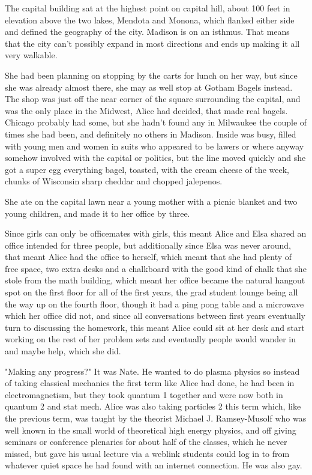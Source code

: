 The capital building sat at the highest point on capital hill, about 100 feet in elevation above the two lakes, Mendota and Monona, which flanked either side and defined the geography of the city. Madison is on an isthmus. That means that the city can't possibly expand in most directions and ends up making it all very walkable.

She had been planning on stopping by the carts for lunch on her way, but since she was already almost there, she may as well stop at Gotham Bagels instead. The shop was just off the near corner of the square surrounding the capital, and was the only place in the Midwest, Alice had decided, that made real bagels. Chicago probably had some, but she hadn't found any in Milwaukee the couple of times she had been, and definitely no others in Madison. Inside was busy, filled with young men and women in suits who appeared to be lawers or where anyway somehow involved with the capital or politics, but the line moved quickly and she got a super egg everything bagel, toasted, with the cream cheese of the week, chunks of Wisconsin sharp cheddar and chopped jalepenos. 

She ate on the capital lawn near a young mother with a picnic blanket and two young children, and made it to her office by three. 

\mypause

Since girls can only be officemates with girls, this meant Alice and Elsa shared an office intended for three people, but additionally since Elsa was never around, that meant Alice had the office to herself, which meant that she had plenty of free space, two extra desks and a chalkboard with the good kind of chalk that she stole from the math building, which meant her office became the natural hangout spot on the first floor for all of the first years, the grad student lounge being all the way up on the fourth floor, though it had a ping pong table and a microwave which her office did not, and since all conversations between first years eventually turn to discussing the homework, this meant Alice could sit at her desk and start working on the rest of her problem sets and eventually people would wander in and maybe help, which she did.

\mypause

"Making any progress?" It was Nate. He wanted to do plasma physics so instead of taking classical mechanics the first term like Alice had done, he had been in electromagnetism, but they took quantum 1 together and were now both in quantum 2 and stat mech. Alice was also taking particles 2 this term which, like the previous term, was taught by the theorist Michael J. Ramsey-Musolf who was well known in the small world of theoretical high energy physics, and off giving seminars or conference plenaries for about half of the classes, which he never missed, but gave his usual lecture via a weblink students could log in to from whatever quiet space he had found with an internet connection. He was also gay. 

